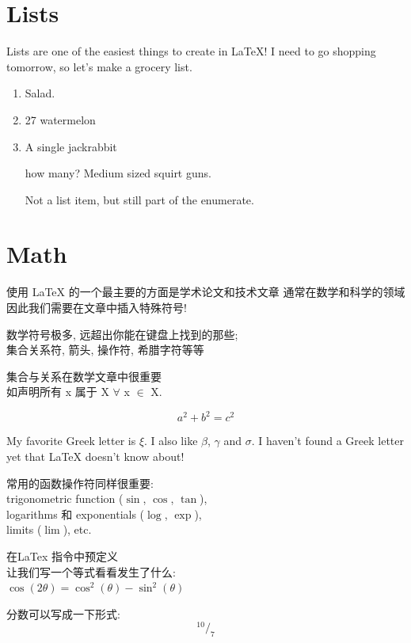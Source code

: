 \documentclass[fontset=adobe, 12pt]{article}
\begin{document}
\section{Lists}
Lists are one of the easiest things to create in \LaTeX! I need to go shopping tomorrow, so let's make a grocery list.
\begin{enumerate}
  \item Salad.
  \item 27 watermelon
  \item A single jackrabbit
  \item[how many?] Medium sized squirt guns.

  Not a list item, but still part of the enumerate.
\end{enumerate}

\section{Math}
使用 \LaTeX \hspace{1pt} 的一个最主要的方面是学术论文和技术文章
通常在数学和科学的领域
因此我们需要在文章中插入特殊符号!

数学符号极多, 远超出你能在键盘上找到的那些;\\
集合关系符, 箭头, 操作符, 希腊字符等等

集合与关系在数学文章中很重要\\
如声明所有 x 属于 X $\forall$ x $\in$ X.

\[a^2 + b^2 = c^2\]

My favorite Greek letter is $\xi$. I also like $\beta$, $\gamma$ and $\sigma$.
I haven't found a Greek letter yet that \LaTeX \hspace{1pt} doesn't know about!

常用的函数操作符同样很重要:\\
trigonometric function ($\sin$, $\cos$, $\tan$),\\
logarithms 和 exponentials ($\log$, $\exp$),\\
limits ($\lim$), etc.

在LaTex 指令中预定义\\
让我们写一个等式看看发生了什么:\\
$\cos(2\theta) = \cos^{2}(\theta) - \sin^{2}(\theta)$

分数可以写成一下形式:
$$ ^{10}/_{7}$$
\end{document}
